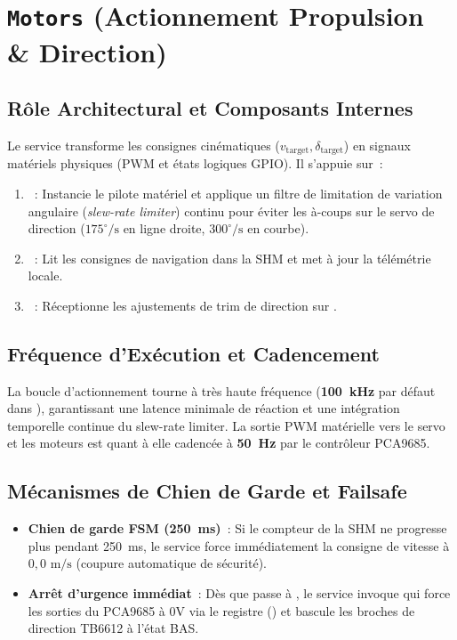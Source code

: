 \section{\texorpdfstring{\texttt{Motors}}{Motors} (Actionnement Propulsion \& Direction)}

\subsection{Rôle Architectural et Composants Internes}
Le service  transforme les consignes cinématiques ($v_{\text{target}}, \delta_{\text{target}}$) en signaux matériels physiques (PWM et états logiques GPIO). Il s'appuie sur~:
\begin{enumerate}
    \item {}~: Instancie le pilote matériel  et applique un filtre de limitation de variation angulaire (\emph{slew-rate limiter}) continu pour éviter les à-coups sur le servo de direction ($175^\circ/\text{s}$ en ligne droite, $300^\circ/\text{s}$ en courbe).
    \item {}~: Lit les consignes de navigation dans la SHM et met à jour la télémétrie locale.
    \item {}~: Réceptionne les ajustements de trim de direction sur .
\end{enumerate}

\subsection{Fréquence d'Exécution et Cadencement}
La boucle d'actionnement tourne à très haute fréquence (\textbf{100~kHz} par défaut dans ), garantissant une latence minimale de réaction et une intégration temporelle continue du slew-rate limiter. La sortie PWM matérielle vers le servo et les moteurs est quant à elle cadencée à \textbf{50~Hz} par le contrôleur PCA9685.

\subsection{Mécanismes de Chien de Garde et Failsafe}
\begin{itemize}
    \item \textbf{Chien de garde FSM (250~ms)}~: Si le compteur  de la SHM ne progresse plus pendant 250~ms, le service force immédiatement la consigne de vitesse à $0{,}0\text{ m/s}$ (coupure automatique de sécurité).
    \item \textbf{Arrêt d'urgence immédiat}~: Dès que  passe à , le service invoque  qui force les sorties du PCA9685 à 0V via le registre  () et bascule les broches de direction TB6612 à l'état BAS.
\end{itemize}

